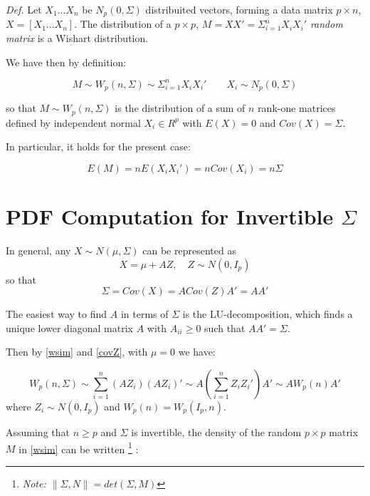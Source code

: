 \documentclass[12pt,openright,twoside,a4paper]{book}
\begin{document}
\textit{Def.} Let $X_1...X_n$ be $N_p(0,\Sigma)$ distribuited vectors, forming a data matrix $p\times n$, $X=[X_1...X_n]$.
The distribution of  a $p\times p$, $M=XX'=\Sigma^n_{i=1}X_iX_i'$ \textit{random matrix}  is a Wishart distribution. \cite{AMS}

We have then by definition:

\begin{equation}
M\sim W_p(n, \Sigma)\sim\Sigma^n_{i=1}X_iX_i' \qquad X_i\sim N_p(0,\Sigma)   
\label{wsim}
\end{equation}


so that $M\sim W_p(n, \Sigma)$  is the distribution of a sum of $n$ rank-one matrices defined by independent normal $X_i \in R^p$ with $E(X)=0$ and $Cov(X)=\Sigma$.

In particular, it holds for the present case:

\begin{equation}
E(M)=nE(X_iX_i') = nCov(X_i) = n\Sigma
\end{equation}

\section{PDF Computation for Invertible $\Sigma$}

In general, any $X\sim N(\mu,\Sigma)$ can be represented as
\begin{equation}
X=\mu + AZ,\quad Z\sim N(0,I_p)
\end{equation}
so that
\begin{equation}
\Sigma= Cov(X) = A Cov(Z)A' = AA'
\label{covZ}
\end{equation}


The easiest way to find $ A$ in terms of $\Sigma$ is the LU-decomposition, which finds a unique lower diagonal matrix $A$ with $A_{ii} \geqslant 0 $ such that $AA' = \Sigma$.

Then by \ref{wsim} and \ref{covZ}, with $\mu=0$ we have:

\begin{equation}
W_p(n, \Sigma)\sim \sum_{i=1}^n(AZ_i)(AZ_i)'\sim A(\sum_{i=1}^nZ_iZ_i')A'\sim AW_p(n)A'
\end{equation}
where $Z_i\sim N(0, I_p)$ and $W_p(n)=W_p(I_p,n)$. 

Assuming that  $n\geq p$ and $\Sigma$ is invertible, the density of the random $p\times p $ matrix $M$ in \ref{wsim} can be written \footnote{\textit{Note: $\|\Sigma , N \| = det (\Sigma , M)$}} :
\end{document}
